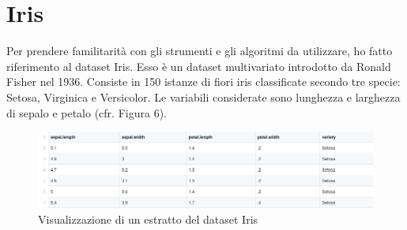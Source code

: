 \documentclass[12pt,italian]{report}
\begin{document}
\section{Iris}
\label{iris}
Per prendere familitarità con gli strumenti e gli algoritmi da utilizzare, ho fatto riferimento al dataset Iris. Esso è un dataset multivariato introdotto da Ronald Fisher nel 1936. Consiste in 150 istanze di fiori iris classificate secondo tre specie: Setosa, Virginica e Versicolor.
Le variabili considerate sono lunghezza e larghezza di sepalo e petalo (cfr. Figura 6). 
\begin{figure}[h]
	\centering
	\includegraphics[width = \textwidth]{immagini/Iris}
	\caption{Visualizzazione di un estratto del dataset Iris}
\end{figure}
\end{document}
